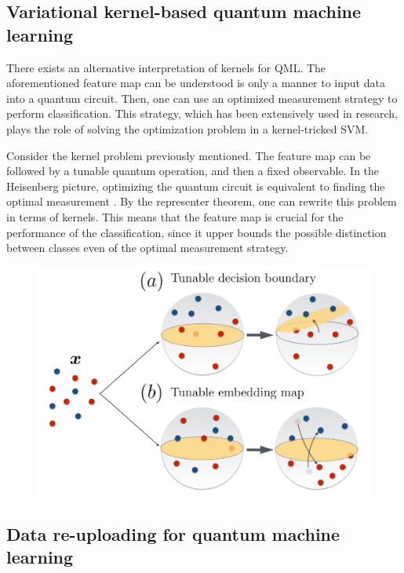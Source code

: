 \documentclass[]{report}
\begin{document}
\subsection{Variational kernel-based quantum machine learning}

There exists an alternative interpretation of kernels for QML. The aforementioned feature map can be understood is only a manner to input data into a quantum circuit. Then, one can use an optimized measurement strategy to perform classification. This strategy, which has been extensively used in research, plays the role of solving the optimization problem in a kernel-tricked SVM. 



Consider the kernel problem previously mentioned. The feature map can be followed by a tunable quantum operation, and then a fixed observable. In the Heisenberg picture, optimizing the quantum circuit is equivalent to finding the optimal measurement \cite{helstrom1976quantum}. By the representer theorem, one can rewrite this problem in terms of kernels. This means that the feature map is crucial for the performance of the classification, since it upper bounds the possible distinction between classes even of the optimal measurement strategy. 

\begin{figure}
\centering
\includegraphics[width = .6\linewidth]{images/berta}
\caption{}
\label{fig.berta}
\end{figure}

\subsection{Data re-uploading for quantum machine learning}\label{sec.re-uploading}
\end{document}
